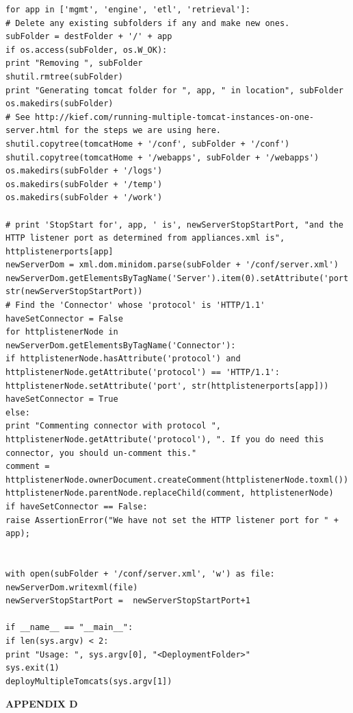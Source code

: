 \documentclass[11pt
  , a4paper
  , article
  , oneside
]{memoir}
\begin{document}
\begin{lstlisting}[style=termstyle]
for app in ['mgmt', 'engine', 'etl', 'retrieval']:
# Delete any existing subfolders if any and make new ones.
subFolder = destFolder + '/' + app
if os.access(subFolder, os.W_OK):
print "Removing ", subFolder
shutil.rmtree(subFolder)
print "Generating tomcat folder for ", app, " in location", subFolder
os.makedirs(subFolder)
# See http://kief.com/running-multiple-tomcat-instances-on-one-server.html for the steps we are using here.
shutil.copytree(tomcatHome + '/conf', subFolder + '/conf')
shutil.copytree(tomcatHome + '/webapps', subFolder + '/webapps')
os.makedirs(subFolder + '/logs')
os.makedirs(subFolder + '/temp')
os.makedirs(subFolder + '/work')

# print 'StopStart for', app, ' is', newServerStopStartPort, "and the HTTP listener port as determined from appliances.xml is", httplistenerports[app]
newServerDom = xml.dom.minidom.parse(subFolder + '/conf/server.xml')
newServerDom.getElementsByTagName('Server').item(0).setAttribute('port', str(newServerStopStartPort))
# Find the 'Connector' whose 'protocol' is 'HTTP/1.1'
haveSetConnector = False
for httplistenerNode in newServerDom.getElementsByTagName('Connector'):
if httplistenerNode.hasAttribute('protocol') and httplistenerNode.getAttribute('protocol') == 'HTTP/1.1':
httplistenerNode.setAttribute('port', str(httplistenerports[app]))
haveSetConnector = True
else:
print "Commenting connector with protocol ", httplistenerNode.getAttribute('protocol'), ". If you do need this connector, you should un-comment this."
comment = httplistenerNode.ownerDocument.createComment(httplistenerNode.toxml())
httplistenerNode.parentNode.replaceChild(comment, httplistenerNode)
if haveSetConnector == False:
raise AssertionError("We have not set the HTTP listener port for " + app);


with open(subFolder + '/conf/server.xml', 'w') as file: 
newServerDom.writexml(file)
newServerStopStartPort =  newServerStopStartPort+1

if __name__ == "__main__":
if len(sys.argv) < 2:
print "Usage: ", sys.argv[0], "<DeploymentFolder>"
sys.exit(1)
deployMultipleTomcats(sys.argv[1])
\end{lstlisting}

\begin{center}
\label{appx:d}\LARGE\textbf{APPENDIX D}
\end{center}
\end{document}
